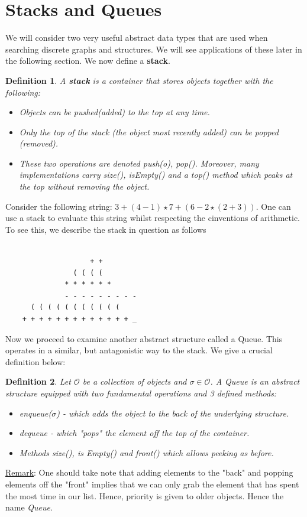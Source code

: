 \documentclass[9pt]{article} %
\newtheorem*{def_}{Definition}
\begin{document}
	\section{\large Stacks and Queues}
	We will consider two very useful abstract data types that are used when searching discrete graphs and structures. We will see applications of these later in the following section. We now define a \textbf{stack}.
	\begin{def_}
		A \textbf{stack} is a container that stores objects together with the following:
			\begin{itemize}
				\item Objects can be pushed(added) to the top at any time.
				\item Only the top of the stack (the object most recently added) can be popped (removed).
				\item These two operations are denoted push(o), pop(). Moreover, many implementations carry size(), isEmpty() and a top() method which peaks at the top without removing the object.
			\end{itemize}
	\end{def_}
		
	Consider the following string: $3 + (4-1) \star 7 + (6-2 \star (2+3))$. One can use a stack to evaluate this string whilst respecting the cinventions of arithmetic. To see this, we describe the stack in question as follows
	\begin{lstlisting}
	
                    + +
                ( ( ( (
              * * * * * *
              - - - - - - - - -
	  ( ( ( ( ( ( ( ( ( ( (
	+ + + + + + + + + + + + + _
	\end{lstlisting}
	
	Now we proceed to examine another abstract structure called a Queue. This operates in a similar, but antagonistic way to the stack. We give a crucial definition below:
	\begin{def_}
		Let $\mathcal{O}$ be a collection of objects and $\sigma \in \mathcal{O}$. A Queue is an abstract structure equipped with two fundamental operations and 3 defined methods:
		\begin{itemize}
			\item enqueue($\sigma$) - which adds the object to the back of the underlying structure.
			\item dequeue - which "pops" the element off the top of the container.
			\item Methods size(), is Empty() and front() which allows peeking as before.
		\end{itemize}
	\end{def_}
	\noindent \underline{Remark}: One should take note that adding elements to the "back" and popping elements off the "front" implies that we can only grab the element that has spent the most time in our list. Hence, priority is given to older objects. Hence the name \emph{Queue}. \\
	
\end{document}
